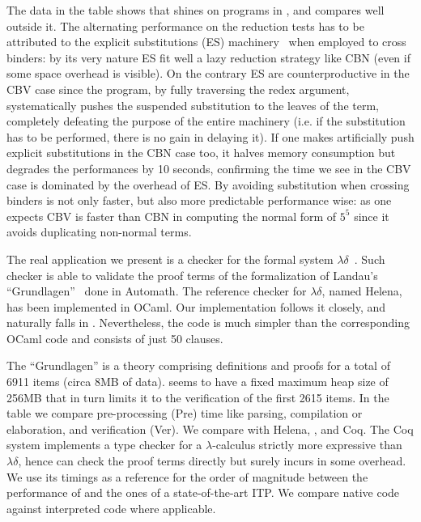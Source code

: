 \documentclass{llncs}
\begin{document}
The data in the 
table shows that \elpi{} shines on programs in \rff{}, and compares well
outside it. The alternating performance \tedius{} on the reduction tests has
to be attributed to the explicit substitutions (ES) machinery~\cite{DBLP:journals/jar/LiangNQ04} when employed to cross binders:
by its very nature ES fit well a lazy reduction strategy like
CBN (even if some space
overhead is visible).  On the contrary ES are counterproductive
in the CBV case since the program, by fully traversing the redex argument,
systematically pushes the suspended substitution to the leaves of the
term, completely defeating the purpose of the entire machinery (i.e. if the
substitution has to be performed, there is no gain in delaying it).
If one makes \tedius{} artificially
push explicit substitutions in the CBN case too, it halves memory consumption
but degrades the performances by 10 seconds, confirming the
time we see in the CBV case is dominated by the overhead of ES.
By avoiding substitution when crossing binders
\elpi{} is not only faster, but also more predictable performance wise: as one
expects CBV is faster than CBN in computing the normal form of $5^5$ since
it avoids duplicating non-normal terms.

The real application we present is a checker for the formal system
$\lambda\delta$~\cite{lambdadeltaJ1,lambdadeltaJ3a}. Such
checker is able to validate the proof terms of the formalization of Landau's
``Grundlagen''~\cite{Jut79} done in Automath. The reference checker for
$\lambda\delta$, named Helena, has been implemented in OCaml.
Our \lp{} implementation follows it closely, and
naturally falls in \rff{}.
Nevertheless, the \lp{} code is much simpler than the corresponding OCaml code
and consists of just 50 clauses.

The ``Grundlagen'' is a theory comprising definitions and proofs
for a total of 6911 items (circa 8MB of data).
\tedius{} seems to have a fixed maximum heap size of 256MB that in turn
limits it to the verification of the first 2615 items.
In the table we compare pre-processing (Pre) time like parsing, compilation
or elaboration, and verification (Ver).
We compare \elpi{} with Helena, \tedius{}, and Coq.
The Coq system implements a
type checker for a $\lambda$-calculus strictly more expressive than
$\lambda\delta$, hence can check the proof terms
directly but surely incurs in some overhead. 
We use its timings as a
reference for the order of magnitude between the performance of \elpi{} and
the ones of a state-of-the-art ITP.
We compare native code against interpreted code where applicable.
\end{document}
